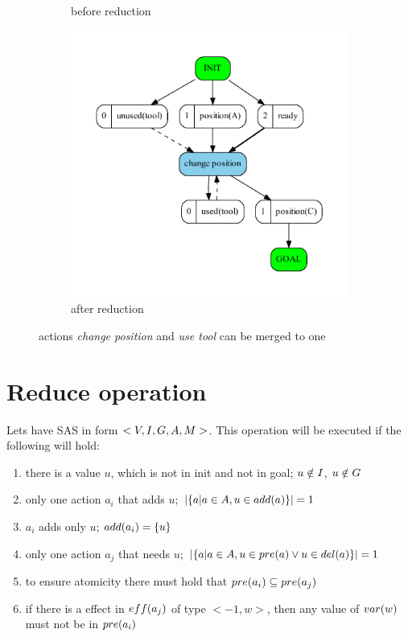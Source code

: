 \begin{figure}
\begin{subfigure}[b]{0.4\textwidth}
			\caption{before reduction}
		\end{subfigure}	
		\begin{subfigure}[b]{0.4\textwidth}
			\includegraphics[scale=0.4]{simpleDependency/figures/simple_output}
			\caption{after reduction}
		\end{subfigure}
		\caption{actions \emph{change position} and \emph{use tool} can be merged to one}		
	\end{figure}
	
	\section{Reduce operation}
	Lets have SAS in form $<V, I, G, A, M{}>$. This operation will be executed if the following will hold:
	
	\begin{enumerate}
		\item there is a value $u$, which is not in init and not in goal; $u \notin I$, $u \notin G$
		\item only one action $a_i$ that adds $u$; $|\{a | a \in A, u \in add(a)\}| = 1$
		\item $a_i$ adds only $u$; $add(a_i) = \{u\}$
		\item only one action $a_j$ that needs $u$; $|\{a | a \in A, u \in pre(a) \lor u \in del(a) \}| = 1$
		\item to ensure atomicity there must hold that $pre(a_i) \subseteq pre(a_j)$
		\item if there is a effect in $eff(a_j)$ of type $<-1,w>$, then any value of $var(w)$ must not be in $pre(a_i)$
	\end{enumerate}
	
